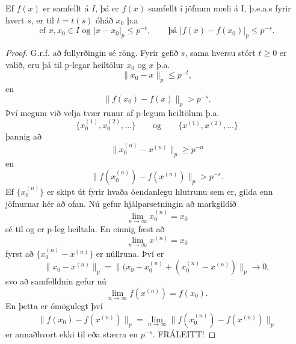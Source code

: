 \begin{setn}
Ef $f(x)$ er samfellt á $I$, þá er $f(x)$ samfellt í jöfnum mæli á I, þ.e.a.s fyrir hvert $s$, er til $t=t(s)$ óháð $x_0$ þ.a 
\begin{equation}
\mbox{ef   } x,x_0\in I \mbox{ og  } |x-x_0|_p \leq p^{-t}, \qquad \mbox{þá  } |f(x)-f(x_0)|_p \leq p^{-s}.
\end{equation}
\end{setn} 
\begin{proof}
G.r.f. að fullyrðingin sé röng. Fyrir gefið $s$, sama hversu stórt $t \geq 0$ er valið, eru þá til p-legar heiltölur $x_0$ og $x$ þ.a.
\begin{equation*}
\|x_0-x\|_p \leq p^{-t},
\end{equation*}
en
\begin{equation*}
\|f(x_0)-f(x)\|_p > p^{-s}.
\end{equation*}
Því megum við velja tvær runur af p-legum heiltölum þ.a.
\begin{equation*}
\{x_0^{(1)}, x_0^{(2)}, \ldots \} \qquad \mbox{og} \qquad \{x^{(1)}, x^{(2)}, \ldots\}
\end{equation*}
þannig að
\begin{equation*}
\|x_0^{(n)}-x^{(n)} \|_p \geq p^{-n}
\end{equation*}
en 
\begin{equation*}
\|f(x_0^{(n)}) - f(x^{(n)})\|_p > p^{-s}.
\end{equation*}
Ef $\{x_0^{(n)}\}$ er skipt út fyrir hvaða óendanlegu hlutrunu sem er, gilda enn jöfnurnar hér að ofan. 
Nú gefur hjálparsetningin að markgildið
\begin{equation*}
\lim_{n\rightarrow \infty} x_0^{(n)}  = x_0
\end{equation*}
sé til og er p-leg heiltala. En einnig fæst að
\begin{equation*}
\lim_{n\rightarrow \infty} x^{(n)} = x_0
\end{equation*}
 fyrst að $\{x_0^{(n)} - x^{(n)} \}$ er núllruna. Því er 
\begin{equation*}
\|x_0-x^{(n)}\|_p = \|(x_0 - x_0^{(n)} + (x_0^{(n)} -x^{(n)}) \|_p \rightarrow 0,
\end{equation*}
svo að samfelldnin gefur nú
\begin{equation*}
\lim_{n\rightarrow \infty} f(x^{(n)}) = f(x_0).
\end{equation*}
En þetta er ómögulegt því
\begin{equation*}
\|f(x_0)-f(x^{(n)})\|_p = \lim_{n\rightarrow \infty} \|f(x_0^{(n)}) - f(x^{(n)})\|_p
\end{equation*}
er annaðhvort ekki til eða stærra en $p^{-s}$. FRÁLEITT!
\end{proof}


